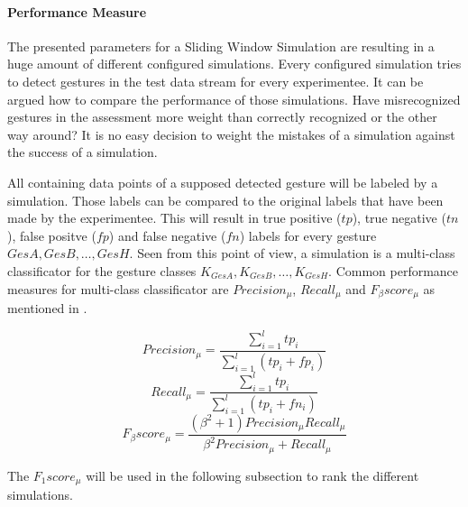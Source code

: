 \paragraph{Performance Measure} \label{performance_measure}
The presented parameters for a Sliding Window Simulation are resulting in a huge amount of different configured
simulations. Every configured simulation tries to detect gestures in the test data stream for every experimentee. It can
be argued how to compare the performance of those simulations. Have misrecognized gestures in the assessment more weight
than correctly recognized or the other way around? It is no easy decision to weight the mistakes of a simulation against
the success of a simulation.

All containing data points of a supposed detected gesture will be labeled by a simulation. Those labels can be compared
to the original labels that have been made by the experimentee. This will result in true positive ($tp$), true negative
($tn$), false positve ($fp$) and false negative ($fn$) labels for every gesture $GesA, GesB, \dots, GesH$. Seen from
this point of view, a simulation is a multi-class classificator for the gesture classes
$K_{GesA}, K_{GesB}, \dots, K_{GesH}$. Common performance measures for multi-class classificator are $Precision_{\mu}$,
$Recall_{\mu}$ and $F_{\beta}score_{\mu}$ as mentioned in \cite{sokolova2009systematic}.

\begin{equation}
    Precision_{\mu} = \frac{\sum \limits_{i=1}^{l} tp_i}{\sum \limits_{i=1}^{l} (tp_i + fp_i)}
\end{equation}
\begin{equation}
    Recall_{\mu} = \frac{\sum \limits_{i=1}^{l} tp_i}{\sum \limits_{i=1}^{l} (tp_i + fn_i)}
\end{equation}
\begin{equation}
    F_{\beta}score_{\mu} = \frac{(\beta^2 + 1)Precision_{\mu} Recall_{\mu}}{\beta^2 Precision_{\mu} + Recall_{\mu}}
\end{equation}

The $F_{1}score_{\mu}$ will be used in the following subsection to rank the different simulations.
